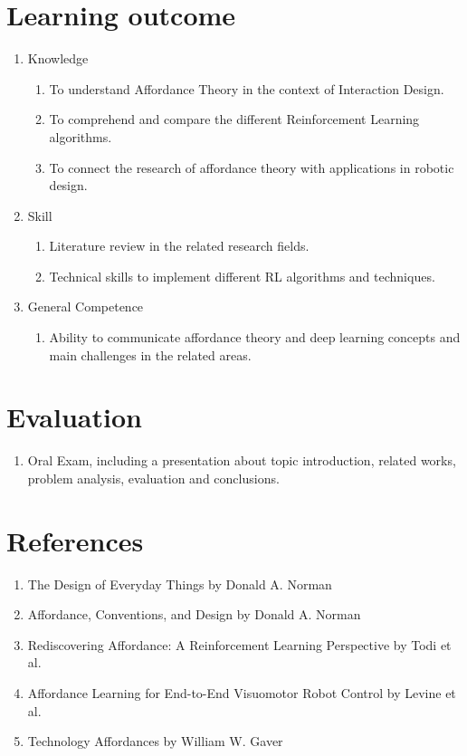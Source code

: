 \documentclass[letterpaper,12pt]{article}
\begin{document}
\section{Learning outcome}

\begin{enumerate}
	\item Knowledge
	\begin{enumerate}
		\item To understand Affordance Theory in the context of Interaction Design.
		\item To comprehend and compare the different Reinforcement Learning algorithms.
		\item To connect the research of affordance theory with applications in robotic design.
	\end{enumerate}
	\item Skill
	\begin{enumerate}
		\item Literature review in the related research fields.
		\item Technical skills to implement different RL algorithms and techniques.
  
	\end{enumerate}
	\item General Competence
	\begin{enumerate}
		\item Ability to communicate affordance theory and deep learning concepts and main challenges in the related areas.
	\end{enumerate}
\end{enumerate}

\section{Evaluation}

\begin{enumerate}
	\item Oral Exam, including a presentation about topic introduction, related works, problem analysis, evaluation and conclusions.
	
\end{enumerate}

\section{References}

\begin{enumerate}
	\item The Design of Everyday Things by Donald A. Norman
	\item Affordance, Conventions, and Design by Donald A. Norman
	\item Rediscovering Affordance:
	A Reinforcement Learning Perspective by Todi et al.
	\item Affordance Learning for End-to-End Visuomotor Robot Control by Levine et al.
	\item Technology Affordances by William W. Gaver
\end{enumerate}
\end{document}

